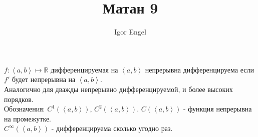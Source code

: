 \documentclass[11pt, oneside]{article}   	%
\title{Матан 9}
\author{Igor Engel}
\date{}
\begin{document}
\maketitle
\section{}
    
    \begin{definition}
        $f: \left<a, b\right> \mapsto \mathbb{R}$ дифференцируемая на $\left<a, b\right>$ непрерывна дифференцируема если $f'$ будет непрерывна на $\left<a, b\right>$.\\
        Аналогично для дважды непрерывно дифференцируемой, и более высоких порядков.\\
        Обозначения: $C^{1}(\left<a, b\right>)$, $C^{2}(\left<a, b\right>)$. $C(\left<a, b\right>)$ - функция непрерывна на промежутке.\\
        $C^{\infty}(\left<a, b\right>)$ - дифференцируема сколько угодно раз.
    \end{definition}
\end{document}
